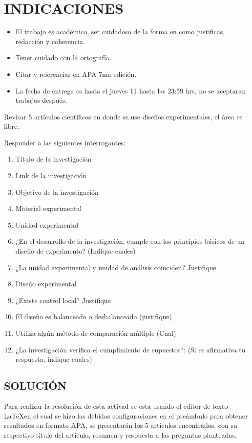 \newpage
\chapter{INDICACIONES}

\begin{itemize}
	\item El trabajo es académico, ser cuidadoso de la forma en como justificas, redacción y coherencia.
	\item Tener cuidado con la ortografía.
	\item Citar y referenciar en APA 7ma edición.
	\item La fecha de entrega es hasta el jueves 11 hasta las 23:59 hrs, no se aceptaran trabajos después. 
\end{itemize}

Revisar 5 artículos científicos en donde se use diseños experimentales, el área es libre.

Responder a las siguientes interrogantes:

\begin{enumerate}
	\item Título de la investigación
	\item Link de la investigación
	\item Objetivo de la investigación
	\item Material experimental
	\item Unidad experimental
	\item ¿En el desarrollo de la investigación, cumple con los principios básicos de un diseño de experimento? (Indique cuales)
	\item ¿La unidad experimental y unidad de análisis coinciden? Justifique
	\item Diseño experimental
	\item ¿Existe control local? Justifique
	\item El diseño es balanceado o desbalanceado (justifique)
	\item Utiliza algún método de comparación múltiple (Cual)
	\item ¿La investigación verifica el cumplimiento de supuestos?: (Si es afirmativa tu respuesta, indique cuales)
\end{enumerate}

\section{SOLUCIÓN}

Para realizar la resolución de esta activad se esta usando el editor de texto \LaTeX en el cual se hizo las debidas configuraciones en el preámbulo para obtener resultados en formato APA, se presentarán los 5 artículos encontrados, con su respectivo titulo del artículo, resumen y respuesta a las preguntas planteadas.

